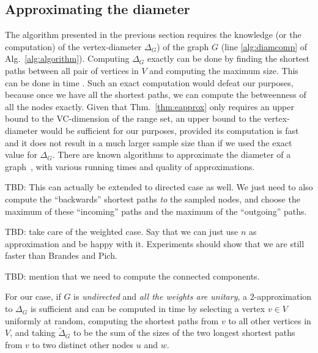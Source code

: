 \subsection{Approximating the diameter}\label{sec:diam}
The algorithm presented in the previous section requires the knowledge (or the
computation) of the vertex-diameter $\Delta_G$) of the graph $G$ (line
\ref{alg:diamcomp} of Alg.~\ref{alg:algorithm}). Computing $\Delta_G$ exactly
can be done by finding the shortest paths between all pair of vertices in $V$
and computing the maximum size. This can be done in time \XXX. Such an exact
computation would defeat our purposes, because once we have all the shortest
paths, we can compute the betweenness of all the nodes exactly. Given that
Thm.~\ref{thm:eapprox} only requires an upper bound to the VC-dimension of the
range set, an upper bound to the vertex-diameter would be sufficient for our
purposes, provided its computation is fast and it does not result in a much
larger sample size than if we used the exact value for $\Delta_G$. There are
known algorithms to approximate the diameter of a
graph~\citep{AingwordCIM99,BoitmanisFL06,RodittyW12}, with various running times
and quality of approximations.

\XXX TBD: This can actually be extended to directed case as well. We just need
to also compute the ``backwards'' shortest paths \emph{to} the sampled nodes, and
choose the maximum of these ``incoming'' paths and the maximum of the
``outgoing'' paths. \MR

\XXX TBD: take care of the weighted case. Say that we can just use $n$ as
approximation and be happy with it. Experiments should show that we are still
faster than Brandes and Pich.

\XXX TBD: mention that we need to compute the connected components.

For our case, if $G$ is \emph{undirected} and \emph{all the weights are
unitary}, a $2$-approximation to $\Delta_G$ is sufficient and can be computed in
time \XXX by selecting a vertex $v\in V$ uniformly at random, computing the
shortest paths from $v$ to all other vertices in $V$, and taking
$\tilde\Delta_G$ to be the sum of the sizes of the two longest shortest paths
from $v$ to two distinct other nodes $u$ and $w$. 

